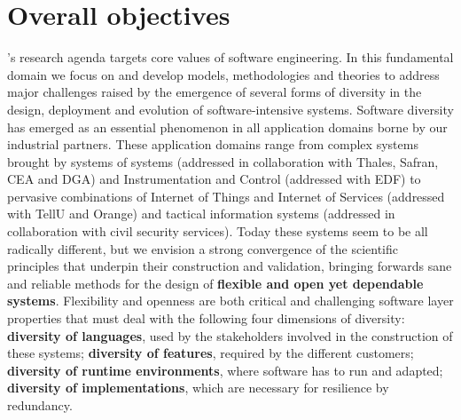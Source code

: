 








\section{Overall objectives}
\label{diverse:context}





  \team{}'s research agenda targets core values of software engineering. 
  In this fundamental domain we focus on and develop models, methodologies and theories to address major challenges raised by the emergence of several forms of diversity in the design, deployment and evolution of software-intensive systems.
Software diversity has emerged as an essential phenomenon in all application domains borne by our industrial partners. These application domains range from complex systems brought by systems of systems (addressed in collaboration with Thales, Safran, CEA and DGA) and Instrumentation and Control (addressed with EDF) to pervasive combinations of Internet of Things and Internet of Services (addressed with TellU and Orange) and tactical information systems (addressed in collaboration with civil security services).
  Today these systems seem to be all  radically  different, but we envision a strong convergence  of the scientific principles that underpin their construction and validation, bringing forwards sane and reliable methods for the design of  \textbf{flexible and open yet dependable systems}. 
  Flexibility and openness are both critical and challenging software layer properties that must deal with the following four dimensions of diversity: \textbf{diversity of languages}, used by the stakeholders involved in the construction of these systems;  \textbf{diversity of features}, required by the different customers; \textbf{diversity of runtime environments}, where software has to run and adapted; \textbf{diversity of implementations}, which are necessary for resilience by redundancy.

